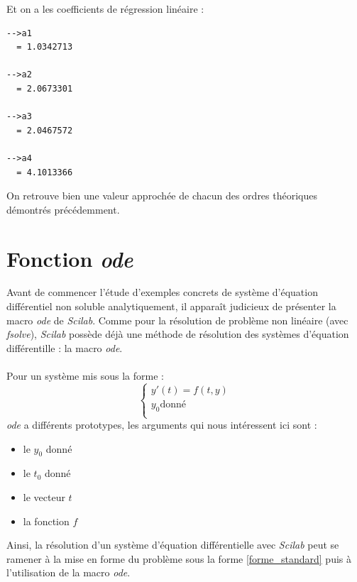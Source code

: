 \documentclass[a4paper,10pt]{report}
\begin{document}
Et on a les coefficients de régression linéaire :
\begin{verbatim}
-->a1
  = 1.0342713  
 
-->a2
  = 2.0673301  
 
-->a3
  = 2.0467572  
 
-->a4
  = 4.1013366 
\end{verbatim}
On retrouve bien une valeur approchée de chacun des ordres théoriques démontrés précédemment.

\newpage
\section{Fonction \textit{ode}}
Avant de commencer l'étude d'exemples concrets de système d'équation différentiel non soluble analytiquement, il apparaît judicieux de présenter la macro \textit{ode} de \textit{Scilab}. Comme pour la résolution de problème non linéaire (avec \textit{fsolve}), \textit{Scilab} possède déjà une méthode de résolution des systèmes d'équation différentille : la macro \textit{ode}.\\ \\
Pour un système mis sous la forme :
\begin{equation}
\label{forme_standard}
\left\lbrace
\begin{array}{l}
y'(t)= f(t,y)  \\
y_0 \text{donné} \\
\end{array}\right.
\end{equation}
\textit{ode} a différents prototypes, les arguments qui nous intéressent ici sont :
\begin{itemize}
\item le $y_0$ donné
\item le $t_0$ donné
\item le vecteur $t$
\item la fonction $f$
\end{itemize}
\indent Ainsi, la résolution d'un système d'équation différentielle avec \textit{Scilab} peut se ramener à la mise en forme du problème sous la forme \ref{forme_standard} puis à l'utilisation de la macro \textit{ode}.
\end{document}
